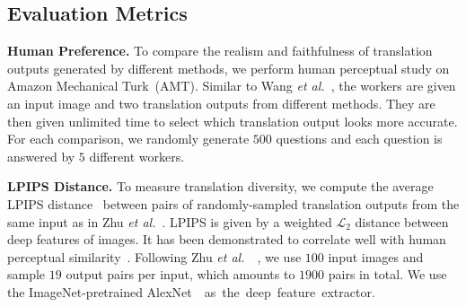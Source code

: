 \documentclass[runningheads]{llncs}
\newcommand{\vpara}[1]{\vspace{0.05in}\noindent\textbf{#1}}
\def\etal{\emph{et al.}\xspace}
\begin{document}
	
	
	
\subsection{Evaluation Metrics}
	\label{sec:metrics}
\vpara{Human Preference.} To compare the realism and faithfulness of translation outputs generated by different methods, we perform human perceptual study on Amazon Mechanical Turk~(AMT). Similar to Wang \etal~\cite{wang2018high}, the workers are given an input image and two translation outputs from different methods. They are then given unlimited time to select which translation output looks more accurate. For each comparison, we randomly generate $500$ questions and each question is answered by $5$ different workers. 


	\vpara{LPIPS Distance.} To measure translation diversity, we compute the average LPIPS distance~\cite{zhang2018unreasonable} between pairs of randomly-sampled translation outputs from the same input as in Zhu \etal~\cite{zhu2017toward}. LPIPS is given by a weighted $\mathcal{L}_{2}$ distance between deep features of images. It has been demonstrated to correlate well with human perceptual similarity~\cite{zhang2018unreasonable}. Following Zhu \etal~~\cite{zhu2017toward}, we use $100$ input images and sample $19$ output pairs per input, which amounts to $1900$ pairs in total. We use the ImageNet-pretrained \mbox{AlexNet~\cite{krizhevsky2012imagenet} as the deep feature extractor.}
	
\end{document}
